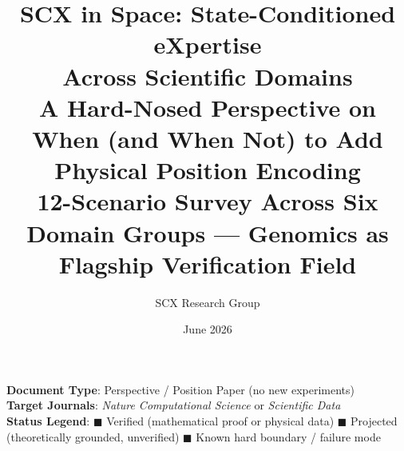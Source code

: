 \documentclass[12pt,a4paper]{article}
\title{
  \textbf{SCX in Space: State-Conditioned eXpertise\\ Across Scientific Domains}\\[8pt]
  \large A Hard-Nosed Perspective on When (and When Not) to Add Physical Position Encoding\\[4pt]
  \normalsize 12-Scenario Survey Across Six Domain Groups — Genomics as Flagship Verification Field
}
\author{SCX Research Group}
\date{June 2026}
\begin{document}
\maketitle

\begin{center}
\textbf{Document Type}: Perspective / Position Paper (no new experiments)\\
\textbf{Target Journals}: \textit{Nature Computational Science} or \textit{Scientific Data}\\[6pt]
\textbf{Status Legend}:
\;\textcolor{verified}{$\blacksquare$ Verified (mathematical proof or physical data)}
\;\textcolor{projected}{$\blacksquare$ Projected (theoretically grounded, unverified)}
\;\textcolor{warning}{$\blacksquare$ Known hard boundary / failure mode}
\end{center}
\end{document}
